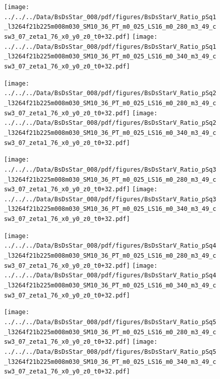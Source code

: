 \documentclass[a4paper,10pt]{article}
\begin{document}
\begin{figure}[p]
 \texttt{[image: ../../../Data/BsDsStar\_008/pdf/figures/BsDsStarV\_Ratio\_pSq1\_l3264f21b225m008m030\_SM10\_36\_PT\_m0\_025\_LS16\_m0\_280\_m3\_49\_csw3\_07\_zeta1\_76\_x0\_y0\_z0\_t0+32.pdf]} 
 \texttt{[image: ../../../Data/BsDsStar\_008/pdf/figures/BsDsStarV\_Ratio\_pSq1\_l3264f21b225m008m030\_SM10\_36\_PT\_m0\_025\_LS16\_m0\_340\_m3\_49\_csw3\_07\_zeta1\_76\_x0\_y0\_z0\_t0+32.pdf]} 
 \end{figure}
\begin{figure}[p]
 \texttt{[image: ../../../Data/BsDsStar\_008/pdf/figures/BsDsStarV\_Ratio\_pSq2\_l3264f21b225m008m030\_SM10\_36\_PT\_m0\_025\_LS16\_m0\_280\_m3\_49\_csw3\_07\_zeta1\_76\_x0\_y0\_z0\_t0+32.pdf]} 
 \texttt{[image: ../../../Data/BsDsStar\_008/pdf/figures/BsDsStarV\_Ratio\_pSq2\_l3264f21b225m008m030\_SM10\_36\_PT\_m0\_025\_LS16\_m0\_340\_m3\_49\_csw3\_07\_zeta1\_76\_x0\_y0\_z0\_t0+32.pdf]} 
 \end{figure}
\begin{figure}[p]
 \texttt{[image: ../../../Data/BsDsStar\_008/pdf/figures/BsDsStarV\_Ratio\_pSq3\_l3264f21b225m008m030\_SM10\_36\_PT\_m0\_025\_LS16\_m0\_280\_m3\_49\_csw3\_07\_zeta1\_76\_x0\_y0\_z0\_t0+32.pdf]} 
 \texttt{[image: ../../../Data/BsDsStar\_008/pdf/figures/BsDsStarV\_Ratio\_pSq3\_l3264f21b225m008m030\_SM10\_36\_PT\_m0\_025\_LS16\_m0\_340\_m3\_49\_csw3\_07\_zeta1\_76\_x0\_y0\_z0\_t0+32.pdf]} 
 \end{figure}
\clearpage
\begin{figure}[p]
 \texttt{[image: ../../../Data/BsDsStar\_008/pdf/figures/BsDsStarV\_Ratio\_pSq4\_l3264f21b225m008m030\_SM10\_36\_PT\_m0\_025\_LS16\_m0\_280\_m3\_49\_csw3\_07\_zeta1\_76\_x0\_y0\_z0\_t0+32.pdf]} 
 \texttt{[image: ../../../Data/BsDsStar\_008/pdf/figures/BsDsStarV\_Ratio\_pSq4\_l3264f21b225m008m030\_SM10\_36\_PT\_m0\_025\_LS16\_m0\_340\_m3\_49\_csw3\_07\_zeta1\_76\_x0\_y0\_z0\_t0+32.pdf]} 
 \end{figure}
\begin{figure}[p]
 \texttt{[image: ../../../Data/BsDsStar\_008/pdf/figures/BsDsStarV\_Ratio\_pSq5\_l3264f21b225m008m030\_SM10\_36\_PT\_m0\_025\_LS16\_m0\_280\_m3\_49\_csw3\_07\_zeta1\_76\_x0\_y0\_z0\_t0+32.pdf]} 
 \texttt{[image: ../../../Data/BsDsStar\_008/pdf/figures/BsDsStarV\_Ratio\_pSq5\_l3264f21b225m008m030\_SM10\_36\_PT\_m0\_025\_LS16\_m0\_340\_m3\_49\_csw3\_07\_zeta1\_76\_x0\_y0\_z0\_t0+32.pdf]} 
 \end{figure}
\clearpage
\end{document}
